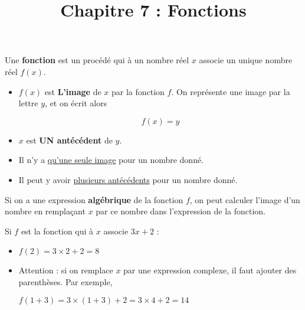 \documentclass[
	classe=$2^{de}$,
	headerTitle=Cours\space Chapitre\space 7
]{coursclass}
\title{Chapitre 7 : Fonctions}
\date{}
\author{}
\begin{document}
\maketitle

\begin{definition}
	Une \textbf{fonction} est un procédé qui à un nombre réel $x$ associe un unique nombre réel $f(x)$.

	\begin{minipage}{0.65\textwidth}
		\begin{itemize}
			\item $f(x)$ est \textbf{L'image} de $x$ par la fonction $f$. On représente une image par la lettre $y$, et on écrit alors

			      $$ f(x) = y $$
			\item $x$ est \textbf{UN antécédent} de $y$.
		\end{itemize}
	\end{minipage}
	\begin{minipage}{0.3\textwidth}
		\hspace{2em}
	\end{minipage}
\end{definition}

\begin{remarque}
	\begin{itemize}
		\item Il n'y a \uline{qu'une seule image} pour un nombre donné.
		\item Il peut y avoir \uline{plusieurs antécédents} pour un nombre donné.
	\end{itemize}
\end{remarque}

\begin{definition}
	Si on a une expression \textbf{algébrique} de la fonction $f$, on peut calculer l'image d'un nombre en remplaçant $x$ par ce nombre dans l'expression de la fonction.
\end{definition}

\begin{exemple}
	Si $f$ est la fonction qui à $x$ associe $3x + 2$ :
	\begin{itemize}
		\item $f(2) = 3×2 + 2 = 8$
		\item Attention : si on remplace $x$ par une expression complexe, il faut ajouter des parenthèses. Par exemple,

		      $f(1 + 3) = 3×(1 + 3) + 2 = 3×4 + 2 = 14$
	\end{itemize}
\end{exemple}
\end{document}
